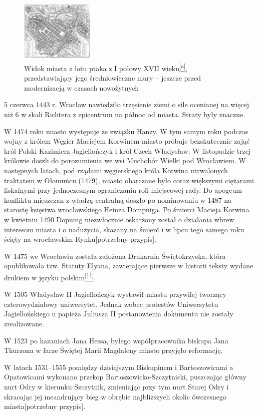 \documentclass{article}
\begin{document}
\begin{figure}
\includegraphics[width =3.5cm, height = 3.0cm]{images/Zdjecie04.jpg}
    \caption{Widok miasta z lotu ptaka z I połowy XVII wieku\protect\hyperlink{a}{\textsuperscript{[a]}}, przedstawiający jego średniowieczne mury – jeszcze przed modernizacją w czasach nowożytnych}
\end{figure}

5 czerwca 1443 r. Wrocław nawiedziło trzęsienie ziemi o sile ocenianej na więcej niż 6 w skali Richtera z epicentrum na północ od miasta. Straty były znaczne.

W 1474 roku miasto występuje ze związku Hanzy. W tym samym roku podczas wojny z królem Węgier Maciejem Korwinem miasto próbuje bezskutecznie zająć król Polski Kazimierz Jagiellończyk i król Czech Władysław. W listopadzie trzej królowie doszli do porozumienia we wsi Muchobór Wielki pod Wrocławiem. W następnych latach, pod rządami węgierskiego króla Korwina utrwalonych traktatem w Ołomuńcu (1479), miasto obarczane było coraz większymi ciężarami fiskalnymi przy jednoczesnym ograniczaniu roli miejscowej rady. Do apogeum konfliktu mieszczan z władzą centralną doszło po nominowaniu w 1487 na starostę księstwa wrocławskiego Heinza Dompniga. Po śmierci Macieja Korwina w kwietniu 1490 Dopning niezwłocznie oskarżony został o działania wbrew interesom miasta i o nadużycia, skazany na śmierć i w lipcu tego samego roku ścięty na wrocławskim Rynku[potrzebny przypis].

W 1475 we Wrocławiu została założona Drukarnia Świętokrzyska, która opublikowała tzw. Statuty Elyana, zawierające pierwsze w historii teksty wydane drukiem w języku polskim\hyperlink{11}{\textsuperscript{[11]}}.

W 1505 Władysław II Jagiellończyk wystawił miastu przywilej tworzący czterowydziałowy uniwersytet. Jednak wobec protestów Uniwersytetu Jagiellońskiego u papieża Juliusza II postanowienia dokumentu nie zostały zrealizowane.

W 1523 po kazaniach Jana Hessa, byłego współpracownika biskupa Jana Thurzona w farze Świętej Marii Magdaleny miasto przyjęło reformację.

W latach 1531–1555 pomiędzy dzisiejszym Biskupinem i Bartoszowicami a Opatowicami wykonano przekop Bartoszowicko-Szczytnicki, puszczając główny nurt Odry w kierunku Szczytnik, zmieniając przy tym nurt Starej Odry i skracając jej meandrujący bieg w obrębie najbliższych okolic ówczesnego miasta[potrzebny przypis].
\end{document}
